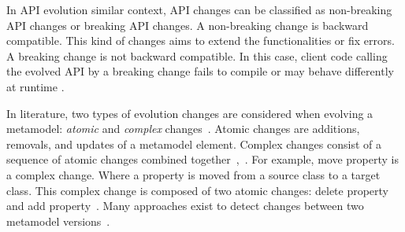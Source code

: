  In API evolution similar context, API changes can be classified as non-breaking API changes or breaking API changes. A non-breaking change is backward compatible. This kind of changes aims to extend the functionalities or fix errors. A breaking change is not backward compatible. In this case, client code calling the evolved API by a breaking change fails to compile or may behave differently at runtime \cite{dig2006apis}.
 
 
 In literature, two types of evolution changes are considered when evolving a metamodel: \emph{atomic} and \emph{complex} changes~\cite{hebig2016approaches,Herrmannsdoerfer2011}. 
 Atomic changes are additions, removals, and updates of a metamodel element. Complex changes consist of a sequence of atomic changes combined together~\cite{vermolen_reconstructing_2012},~\cite{khelladi2015detecting}. For example, move property is a complex change. Where a property is moved from a source class to a target class. This complex change is composed of two atomic changes: delete property and add property~\cite{Herrmannsdoerfer2011}. 
 Many approaches exist to detect changes between two metamodel versions~\cite{Alter2015, williams2012searching,cicchetti_managing_2009,langer_posteriori_2013,vermolen_reconstructing_2012,Khelladi2016,bettini2022executable}.
% 	
% 		
% 	
 	
